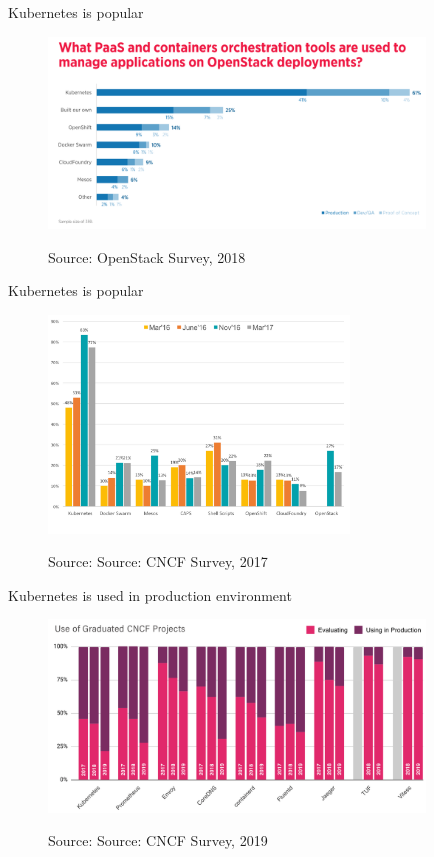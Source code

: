 \documentclass{beamer}
\newcommand{\source}[1]{\caption*{Source: {#1}} }
\begin{document}
\begin{frame}{Kubernetes is popular}%
\begin{figure}
	\includegraphics[width=10cm]{figures/k8s-openstack-survey.png}
	\label{fig:k8s-openstack-survey}
	\caption{Source: OpenStack Survey, 2018}
	\source{OpenStack Survey, 2018}
\end{figure}
\end{frame}

\begin{frame}{Kubernetes is popular}%
\begin{figure}
	\includegraphics[width=8cm]{figures/cncf-container-orchestrators.png}
	\label{fig:cncf-container-orchestrators}
	\source{Source: CNCF Survey, 2017}
\end{figure}
\end{frame}

\begin{frame}{Kubernetes is used in production environment}%
\begin{figure}
	\includegraphics[width=10cm]{figures/cncf-k8s-used-in-production.png}
	\label{fig:cncf-k8s-used-in-production}
	\source{Source: CNCF Survey, 2019}
\end{figure}
\end{frame}
\end{document}
